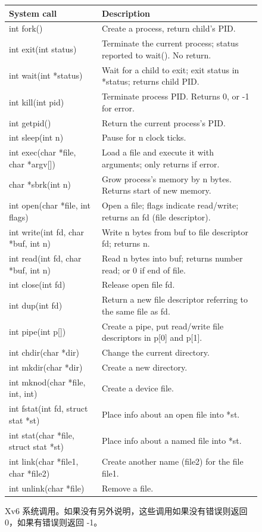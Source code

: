    \begin{figure}[t]
\center
\begin{tabular}{ll}
{\bf System call} & {\bf Description}  \\ 
\midrule int fork() & Create a process, return child's PID.  \\ int exit(int status) & Terminate the current process; status reported to wait(). No return.  \\ int wait(int *status) & Wait for a child to exit; exit status in *status; returns child PID.  \\ int kill(int pid) & Terminate process PID. Returns 0, or -1 for error.  \\ int getpid() & Return the current process's PID.  \\ int sleep(int n) & Pause for n clock ticks.  \\ int exec(char *file, char *argv[]) & Load a file and execute it with arguments; only returns if error.  \\ char *sbrk(int n) & Grow process's memory by n bytes. Returns start of new memory.  \\ int open(char *file, int flags) & Open a file; flags indicate read/write; returns an fd (file descriptor).  \\ int write(int fd, char *buf, int n) & Write n bytes from buf to file descriptor fd; returns n.  \\ int read(int fd, char *buf, int n) & Read n bytes into buf; returns number read; or 0 if end of file.  \\ int close(int fd) & Release open file fd.  \\ int dup(int fd) & Return a new file descriptor referring to the same file as fd. \\ int pipe(int p[]) & Create a pipe, put read/write file descriptors in p[0] and p[1].  \\ int chdir(char *dir) & Change the current directory.  \\ int mkdir(char *dir) & Create a new directory.  \\ int mknod(char *file, int, int) & Create a device file.  \\ int fstat(int fd, struct stat *st) & Place info about an open file into *st.  \\ int stat(char *file, struct stat *st) & Place info about a named file into *st.  \\ int link(char *file1, char *file2) & Create another name (file2) for the file file1.  \\ int unlink(char *file) & Remove a file.  \\ 
\end{tabular}
\caption{Xv6 系统调用。如果没有另外说明，这些调用如果没有错误则返回 0，如果有错误则返回 -1。  }
\label{fig:api}
\end{figure}     

